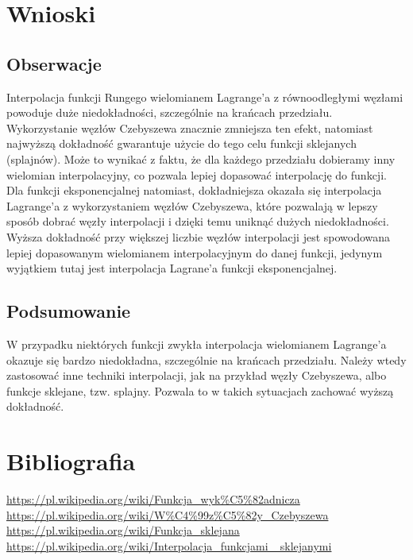 \documentclass[11pt]{scrartcl}
\begin{document}
    \section{Wnioski}
    \subsection{Obserwacje}
    Interpolacja funkcji Rungego wielomianem Lagrange'a z równoodległymi
    węzłami powoduje duże niedokładności, szczególnie na krańcach
    przedziału. Wykorzystanie węzłów Czebyszewa znacznie zmniejsza ten
    efekt, natomiast najwyższą dokładność gwarantuje użycie do tego celu
    funkcji sklejanych (splajnów). Może to wynikać z faktu, że dla
    każdego przedziału dobieramy inny wielomian interpolacyjny, co
    pozwala lepiej dopasować interpolację do funkcji. \\
    Dla funkcji eksponencjalnej natomiast, dokładniejsza okazała
    się interpolacja Lagrange'a z wykorzystaniem węzłów Czebyszewa,
    które pozwalają w lepszy sposób dobrać węzły interpolacji i dzięki
    temu uniknąć dużych niedokładności. \\
    Wyższa dokładność przy większej liczbie węzłów interpolacji
    jest spowodowana lepiej dopasowanym wielomianem interpolacyjnym
    do danej funkcji, jedynym wyjątkiem tutaj jest interpolacja
    Lagrane'a funkcji eksponencjalnej.

    \subsection{Podsumowanie}
    W przypadku niektórych funkcji zwykła interpolacja wielomianem
    Lagrange'a okazuje się bardzo niedokładna, szczególnie na
    krańcach przedziału. Należy wtedy zastosować inne techniki
    interpolacji, jak na przykład węzły Czebyszewa, albo funkcje
    sklejane, tzw. splajny. Pozwala to w takich sytuacjach zachować
    wyższą dokładność.

    \section{Bibliografia}
    \url{https://pl.wikipedia.org/wiki/Funkcja_wyk%C5%82adnicza} \\
    \url{https://pl.wikipedia.org/wiki/W%C4%99z%C5%82y_Czebyszewa} \\
    \url{https://pl.wikipedia.org/wiki/Funkcja_sklejana} \\
    \url{https://pl.wikipedia.org/wiki/Interpolacja_funkcjami_
        sklejanymi}
\end{document}
